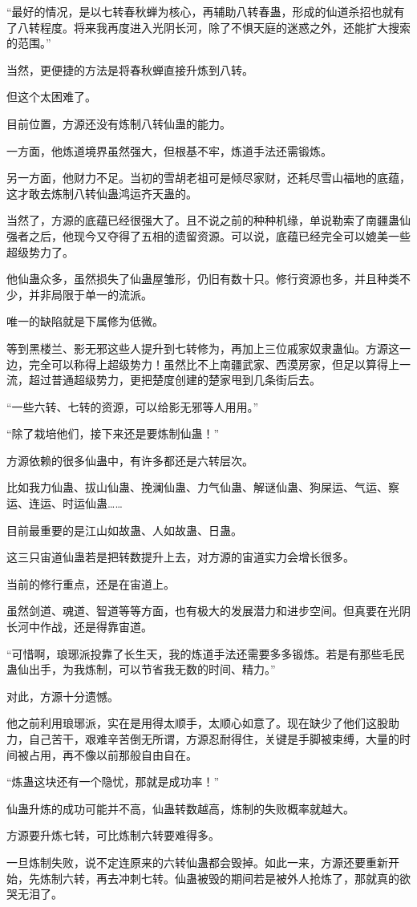 \begin{this_body}
“最好的情况，是以七转春秋蝉为核心，再辅助八转春蛊，形成的仙道杀招也就有了八转程度。将来我再度进入光阴长河，除了不惧天庭的迷惑之外，还能扩大搜索的范围。”

当然，更便捷的方法是将春秋蝉直接升炼到八转。

但这个太困难了。

目前位置，方源还没有炼制八转仙蛊的能力。

一方面，他炼道境界虽然强大，但根基不牢，炼道手法还需锻炼。

另一方面，他财力不足。当初的雪胡老祖可是倾尽家财，还耗尽雪山福地的底蕴，这才敢去炼制八转仙蛊鸿运齐天蛊的。

当然了，方源的底蕴已经很强大了。且不说之前的种种机缘，单说勒索了南疆蛊仙强者之后，他现今又夺得了五相的遗留资源。可以说，底蕴已经完全可以媲美一些超级势力了。

他仙蛊众多，虽然损失了仙蛊屋雏形，仍旧有数十只。修行资源也多，并且种类不少，并非局限于单一的流派。

唯一的缺陷就是下属修为低微。

等到黑楼兰、影无邪这些人提升到七转修为，再加上三位戚家奴隶蛊仙。方源这一边，完全可以称得上超级势力！虽然比不上南疆武家、西漠房家，但足以算得上一流，超过普通超级势力，更把楚度创建的楚家甩到几条街后去。

“一些六转、七转的资源，可以给影无邪等人用用。”

“除了栽培他们，接下来还是要炼制仙蛊！”

方源依赖的很多仙蛊中，有许多都还是六转层次。

比如我力仙蛊、拔山仙蛊、挽澜仙蛊、力气仙蛊、解谜仙蛊、狗屎运、气运、察运、连运、时运仙蛊……

目前最重要的是江山如故蛊、人如故蛊、日蛊。

这三只宙道仙蛊若是把转数提升上去，对方源的宙道实力会增长很多。

当前的修行重点，还是在宙道上。

虽然剑道、魂道、智道等等方面，也有极大的发展潜力和进步空间。但真要在光阴长河中作战，还是得靠宙道。

“可惜啊，琅琊派投靠了长生天，我的炼道手法还需要多多锻炼。若是有那些毛民蛊仙出手，为我炼制，可以节省我无数的时间、精力。”

对此，方源十分遗憾。

他之前利用琅琊派，实在是用得太顺手，太顺心如意了。现在缺少了他们这股助力，自己苦干，艰难辛苦倒无所谓，方源忍耐得住，关键是手脚被束缚，大量的时间被占用，再不像以前那般自由自在。

“炼蛊这块还有一个隐忧，那就是成功率！”

仙蛊升炼的成功可能并不高，仙蛊转数越高，炼制的失败概率就越大。

方源要升炼七转，可比炼制六转要难得多。

一旦炼制失败，说不定连原来的六转仙蛊都会毁掉。如此一来，方源还要重新开始，先炼制六转，再去冲刺七转。仙蛊被毁的期间若是被外人抢炼了，那就真的欲哭无泪了。

\end{this_body}


